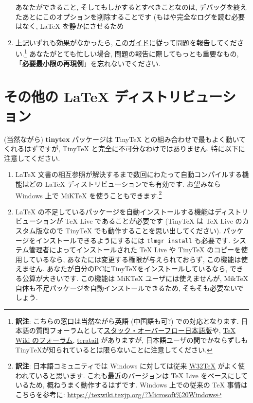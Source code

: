 \documentclass[
  xelatex,ja=standard,jafont=noto]{bxjsreport}
\begin{document}
\begin{enumerate}
  あなたができること, そしてもしかするとすべきことなのは,
  デバッグを終えたあとにこのオプションを削除することです
  (もはや完全なログを読む必要はなく, LaTeX を静かにさせるため
\item
  上記いずれも効果がなかったら,
  \href{https://yihui.org/issue/}{このガイド}に従って問題を報告してください.\footnote{\textbf{訳注}:
    こちらの窓口は当然ながら英語 (中国語も可?) での対応となります.
    日本語の質問フォーラムとして\href{https://ja.stackoverflow.com/questions/tagged/latex}{スタック・オーバーフロー日本語版}や,
    \href{https://oku.edu.mie-u.ac.jp/tex/}{TeX Wiki のフォーラム},
    \href{https://teratail.com/tags/LaTeX}{teratail} がありますが,
    日本語ユーザの間でかならずしもTinyTeXが知られているとは限らないことに注意してください.}
  あなたがとても忙しい場合, 問題の報告に際してもっとも重要なもの,
  「\textbf{必要最小限の再現例}」を忘れないでください.
\end{enumerate}

\hypertarget{ux305dux306eux4ed6ux306e-latex-ux30c7ux30a3ux30b9ux30c8ux30eaux30d3ux30e5ux30fcux30b7ux30e7ux30f3}{%
\section{その他の LaTeX
ディストリビューション}\label{ux305dux306eux4ed6ux306e-latex-ux30c7ux30a3ux30b9ux30c8ux30eaux30d3ux30e5ux30fcux30b7ux30e7ux30f3}}

(当然ながら) \textbf{tinytex} パッケージは TinyTeX
との組み合わせで最もよく動いてくれるはずですが, TinyTeX
と完全に不可分なわけではありません. 特に以下に注意してください.

\begin{enumerate}
\def\labelenumi{\arabic{enumi}.}
\item
  LaTeX
  文書の相互参照が解決するまで数回にわたって自動コンパイルする機能はどの
  LaTeX ディストリビューションでも有効です. お望みなら Windows 上で
  MiKTeX を使うこともできます.\footnote{\textbf{訳注}:
    日本語コミュニティでは Windows に対しては従来
    \href{http://w32tex.org/}{W32TeX} がよく使われていると思います.
    これも最近のバージョンは TeX Live をベースにしているため,
    概ねうまく動作するはずです. Windows 上での従来の TeX
    事情はこちらを参考に:
    \url{https://texwiki.texjp.org/?Microsoft\%20Windows}}
\item
  LaTeX
  の不足しているパッケージを自動インストールする機能はディストリビューションが
  TeX Live であることが必要です (TinyTeX は TeX Live のカスタム版なので
  TinyTeX でも動作することを思い出してください).
  パッケージをインストールできるようにするには \texttt{tlmgr\ install}
  も必要です. システム管理者によってインストールされた TeX Live や
  TinyTeX のコピーを使用しているなら,
  あなたには変更する権限が与えられておらず, この機能は使えません.
  あなたが自分のPCにTinyTeXをインストールしているなら,
  できる公算が大きいです. この機能は MiKTeX ユーザには使えませんが,
  MikTeX 自体も不足パッケージを自動インストールできるため,
  そもそも必要ないでしょう.
\end{enumerate}
\end{document}
